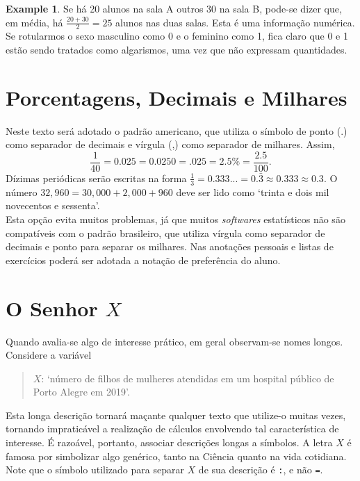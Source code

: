 \documentclass[
]{book}
\theoremstyle{definition}
\theoremstyle{definition}
\newtheorem{example}{Example}[chapter]
\theoremstyle{definition}
\theoremstyle{remark}
\begin{document}
\begin{example}
\protect\hypertarget{exm:alg-num}{}{\label{exm:alg-num} }Se há 20 alunos na sala A outros 30 na sala B, pode-se dizer que, em média, há \(\frac{20+30}{2}=25\) alunos nas duas salas. Esta é uma informação numérica. Se rotularmos o sexo masculino como 0 e o feminino como 1, fica claro que 0 e 1 estão sendo tratados como algarismos, uma vez que não expressam quantidades.
\end{example}

\hypertarget{porcentagens-decimais-e-milhares}{%
\section{Porcentagens, Decimais e Milhares}\label{porcentagens-decimais-e-milhares}}

Neste texto será adotado o padrão americano, que utiliza o símbolo de ponto (.) como separador de decimais e vírgula (,) como separador de milhares. Assim, \[\frac{1}{40}  = 0.025 = 0.0250 = .025 = 2.5\% = \frac{2.5}{100}.\] Dízimas periódicas serão escritas na forma \(\frac{1}{3} = 0.333... = 0.\bar{3} \approx 0.333 \approx 0.3\). O número \(32,960 = 30,000 + 2,000 + 960\) deve ser lido como `trinta e dois mil novecentos e sessenta'.\\
Esta opção evita muitos problemas, já que muitos \emph{softwares} estatísticos não são compatíveis com o padrão brasileiro, que utiliza vírgula como separador de decimais e ponto para separar os milhares. Nas anotações pessoais e listas de exercícios poderá ser adotada a notação de preferência do aluno.

\hypertarget{o-senhor-x}{%
\section{\texorpdfstring{O Senhor \(X\)}{O Senhor X}}\label{o-senhor-x}}

Quando avalia-se algo de interesse prático, em geral observam-se nomes longos. Considere a variável

\begin{quote}
\(X\): `número de filhos de mulheres atendidas em um hospital público de Porto Alegre em 2019'.
\end{quote}

Esta longa descrição tornará maçante qualquer texto que utilize-o muitas vezes, tornando impraticável a realização de cálculos envolvendo tal característica de interesse. É razoável, portanto, associar descrições longas a símbolos. A letra \(X\) é famosa por simbolizar algo genérico, tanto na Ciência quanto na vida cotidiana. Note que o símbolo utilizado para separar \(X\) de sua descrição é \texttt{:}, e não \texttt{=}.
\end{document}
